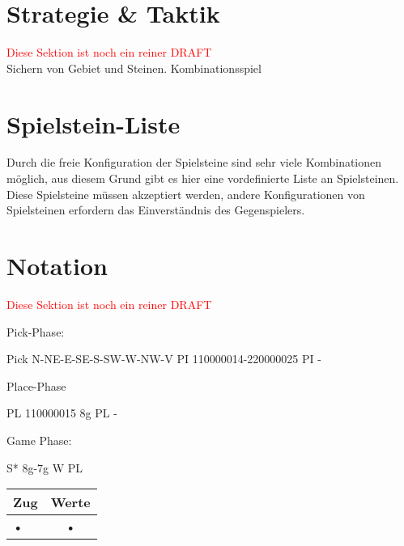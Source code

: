 \documentclass{article}
\begin{document}
\section{Strategie \& Taktik}
	\textcolor{red}{Diese Sektion ist noch ein reiner DRAFT}\\
	
	Sichern von Gebiet und Steinen.
	Kombinationsspiel
	
	
	

\section{Spielstein-Liste}
	
	Durch die freie Konfiguration der Spielsteine sind sehr viele Kombinationen möglich, 
	aus diesem Grund gibt es hier eine vordefinierte Liste an Spielsteinen. Diese Spielsteine
	müssen akzeptiert werden, andere Konfigurationen von Spielsteinen erfordern das Einverständnis
	des Gegenspielers.
	
	
	

\section{Notation}

\textcolor{red}{Diese Sektion ist noch ein reiner DRAFT}


Pick-Phase:

Pick N-NE-E-SE-S-SW-W-NW-V
PI 110000014-220000025
PI - 

Place-Phase
 
PL 110000015 8g
PL -

Game Phase:

S* 8g-7g
W 
PL

\begin{tabular}{|l|c||}
\hline Zug & Werte \\ \hline
• & • \\  
\end{tabular} 
\end{document}

